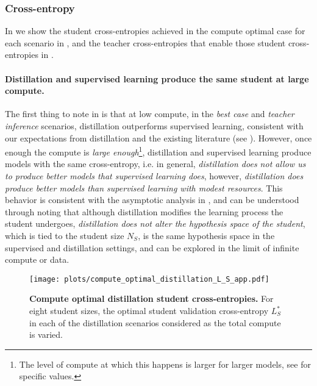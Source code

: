 \FloatBarrier
\subsubsection{Cross-entropy}
\label{sssec:cross-entropy}

In 
we show the student cross-entropies achieved in the compute optimal case for each scenario in
,
and the teacher cross-entropies that enable those student cross-entropies in .

\paragraph{Distillation and supervised learning produce the same student at large compute.}
The first thing to note in 
is that at low compute,
in the \emph{best case} and \emph{teacher inference}
scenarios, distillation outperforms supervised learning,
consistent with our expectations from distillation and the existing literature (see ).
However, once enough the compute is \emph{large enough}\footnote{The level of compute at which this happens is larger for larger models, see  for specific values.},
distillation and supervised learning produce models with the same cross-entropy,
i.e. in general, \emph{distillation does not allow us to produce better models that supervised learning does},
however, \emph{distillation  does produce better models than supervised learning with modest resources}.
This behavior is consistent with the asymptotic analysis in
,
and can be understood through noting that although distillation modifies the learning process the student undergoes, \emph{distillation does not alter the hypothesis space of the student}, which is tied to the student size $N_S$, is the same hypothesis space in the supervised and distillation settings,
and can be explored in the limit of infinite compute or data.

\begin{figure}[h]
	\centering
	\texttt{[image: plots/compute\_optimal\_distillation\_L\_S\_app.pdf]}
	\caption{\textbf{Compute optimal distillation student cross-entropies.} For eight student sizes, the optimal student validation cross-entropy $L_S^*$ in each of the distillation scenarios considered as the total compute is varied.
	}
	\label{fig:compute-optimal-distillation-student-loss-app}
\end{figure}

